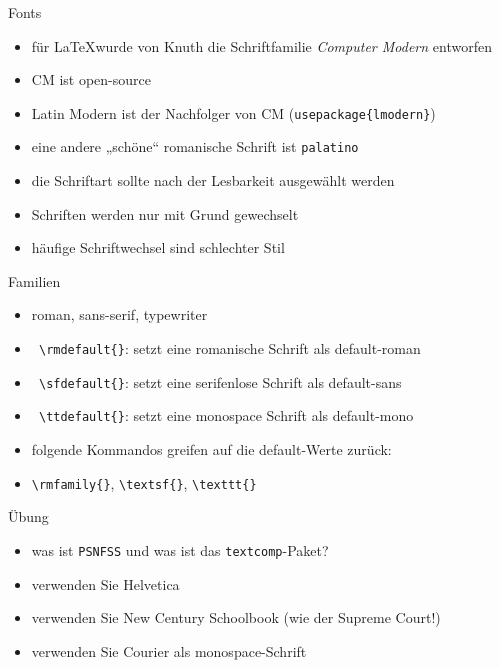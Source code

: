 \begin{frame}[fragile]{Fonts}

\begin{itemize}
      \item für \LaTeX wurde von Knuth die Schriftfamilie \textit{Computer Modern} entworfen
      \item CM ist open-source
      \item Latin Modern ist der Nachfolger von CM (\lstinline|usepackage{lmodern}|)
      \item eine andere „schöne“ romanische Schrift ist \texttt{palatino}
      \item die Schriftart sollte nach der Lesbarkeit ausgewählt werden
      \item Schriften werden nur mit Grund gewechselt
      \item häufige Schriftwechsel sind schlechter Stil
\end{itemize}
\end{frame}

\begin{frame}[fragile]{Familien}
    \begin{itemize}
      \item roman, sans-serif, typewriter
      \item \lstinline| \rmdefault{}|: setzt eine romanische Schrift als default-roman
      \item \lstinline| \sfdefault{}|: setzt eine serifenlose Schrift als default-sans
      \item \lstinline| \ttdefault{}|: setzt eine monospace Schrift als default-mono
      \item folgende Kommandos greifen auf die default-Werte zurück:
      \item \lstinline|\rmfamily{}|, \lstinline|\textsf{}|, \lstinline|\texttt{}|
    \end{itemize}
\end{frame}

\begin{frame}[fragile]{Übung}
    \begin{itemize}
        \item was ist \texttt{PSNFSS} und was ist das \lstinline|textcomp|-Paket?
        \item verwenden Sie Helvetica
        \item verwenden Sie New Century Schoolbook (wie der Supreme Court!)
        \item verwenden Sie Courier als monospace-Schrift
    \end{itemize}
\end{frame}

